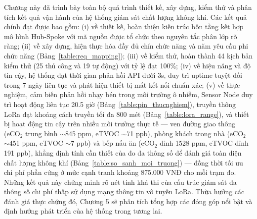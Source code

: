 \documentclass[../DoAn.tex]{subfiles}
\begin{document}
Chương này đã trình bày toàn bộ quá trình thiết kế, xây dựng, kiểm thử và phân tích kết quả vận hành của hệ thống giám sát chất lượng không khí. Các kết quả chính đạt được bao gồm: (i) về thiết kế, hoàn thiện kiến trúc bốn tầng kết hợp mô hình Hub-Spoke với mã nguồn được tổ chức theo nguyên tắc phân lớp rõ ràng; (ii) về xây dựng, hiện thực hóa đầy đủ chín chức năng và năm yêu cầu phi chức năng (Bảng~\ref{table:req_mapping}); (iii) về kiểm thử, hoàn thành 44 kịch bản kiểm thử (25 thủ công và 19 tự động) với tỷ lệ đạt 100\%; (iv) về hiệu năng và độ tin cậy, hệ thống đạt thời gian phản hồi API dưới 3s, duy trì uptime tuyệt đối trong 7 ngày liên tục và phát hiện thiết bị mất kết nối chuẩn xác; (v) về thực nghiệm, cảm biến phản hồi nhạy bén trong môi trường ô nhiễm, Sensor Node duy trì hoạt động liên tục 20.5 giờ (Bảng~\ref{table:pin_thucnghiem}), truyền thông LoRa đạt khoảng cách truyền tối đa 800 mét (Bảng~\ref{table:lora_range}), và thiết bị hoạt động tin cậy trên nhiều môi trường thực tế — ven đường giao thông (eCO$_2$ trung bình $\sim$845 ppm, eTVOC $\sim$71 ppb), phòng khách trong nhà (eCO$_2$ $\sim$451 ppm, eTVOC $\sim$7 ppb) và bếp nấu ăn (eCO$_2$ đỉnh 1528 ppm, eTVOC đỉnh 191 ppb), khẳng định tính cần thiết của đo đa thông số để đánh giá toàn diện chất lượng không khí (Bảng~\ref{table:so_sanh_moi_truong}) — đồng thời tối ưu chi phí phần cứng ở mức cạnh tranh khoảng 875.000 VNĐ cho mỗi trạm đo. Những kết quả này chứng minh rõ nét tính khả thi của cấu trúc giám sát đa thông số chi phí thấp sử dụng mạng thông tin vô tuyến LoRa. Thừa hưởng các đánh giá thực chứng đó, Chương 5 sẽ phân tích tổng hợp các đóng góp nổi bật và định hướng phát triển của hệ thống trong tương lai.
\end{document}
